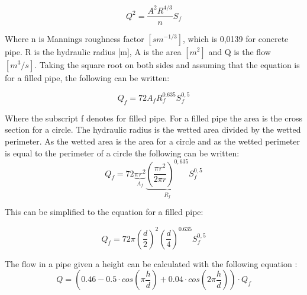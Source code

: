 \begin{equation}
	Q^2=\frac{A^2R^{4/3}}{n}S_f			
\end{equation}

Where n is Mannings roughness factor $[sm^{-1/3}]$, which is 0,0139 for concrete pipe. R is the hydraulic radius [m], A is the area $[m^2]$ and Q is the flow $[m^3/s]$. Taking the square root on both sides and assuming that the equation is for a filled pipe, the following can be written:

\begin{equation}
  Q_{f} = 72 A_{f} R_{f}^{0.635}S_f^{0,5} 
\end{equation}

Where the subscript f denotes for filled pipe. For a filled pipe the area is the cross section for a circle. The hydraulic radius is the wetted area divided by the wetted perimeter. As the wetted area is the area for a circle and as the wetted perimeter is equal to the perimeter of a circle the following can be written: 
\begin{equation}
		Q_{f}= 72 \underbrace{\pi r^2}_{A_{f}}\underbrace{\left(\frac{\pi r^2}{2\pi r}\right)^{0,635} }_{R_{f}}S_f^{0,5} 
\end{equation}

This can be simplified to the equation for a filled pipe:

\begin{equation}%
	Q_{f} =72\pi\left(\frac{d}{2}\right)^2\left(\frac{d}{4}\right)^{0.635} S_f^{0,5}%
\end{equation}


The flow in a pipe given a height can be calculated with the following equation \cite{ikke_stationear}:
\begin{equation}%
 	Q = \left(0.46-0.5 \cdot cos\left(\pi \frac{h}{d}\right)+0.04\cdot cos\left(2\pi\frac{h}{d}\right)\right)\cdot Q_f
\end{equation}

